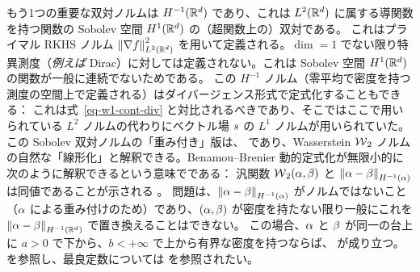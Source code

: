 \begin{example}[$H^{-1}(\RR^\dim)$]\label{exp-sobolev-neg1}
もう1つの重要な双対ノルムは $H^{-1}(\RR^\dim)$ であり、これは $L^2(\mathbb{R}^d)$ に属する導関数を持つ関数の Sobolev 空間 $H^1(\mathbb{R}^d)$ の（超関数上の）双対である。
%
これはプライマル RKHS ノルム $\left\| \nabla f \right\|_{L^2(\mathbb{R}^d)}^2$ を用いて定義される。$\dim=1$ でない限り特異測度（\emph{例えば} Dirac）に対しては定義されない。これは Sobolev 空間 $H^1(\mathbb{R}^d)$ の関数が一般に連続でないためである。
%
この $H^{-1}$ ノルム（零平均で密度を持つ測度の空間上で定義される）はダイバージェンス形式で定式化することもできる：
これは式~\eqref{eq-w1-cont-div} と対比されるべきであり、そこではここで用いられている $L^2$ ノルムの代わりにベクトル場 $s$ の $L^1$ ノルムが用いられていた。
%
この Sobolev 双対ノルムの「重み付き」版は、
であり、Wasserstein $\operatorname{\mathcal{W}}_2$ ノルムの自然な「線形化」と解釈できる。Benamou--Brenier 動的定式化が無限小的に次のように解釈できるという意味でである：
汎関数 $\operatorname{\mathcal{W}}_2(\alpha,\beta)$ と $\left\| \alpha-\beta \right\|_{H^{-1}(\alpha)}$ は同値であることが示される \citep{peyre2011comparison}。
%
問題は、$\left\| \alpha-\beta \right\|_{H^{-1}(\alpha)}$ がノルムではないこと（$\alpha$ による重み付けのため）であり、$(\alpha,\beta)$ が密度を持たない限り一般にこれを $\left\| \alpha-\beta \right\|_{H^{-1}(\mathbb{R}^d)}$ で置き換えることはできない。
%
この場合、$\alpha$ と $\beta$ が同一の台上に $a>0$ で下から、$b<+\infty$ で上から有界な密度を持つならば、
が成り立つ。\citep[Theo. 5.34]{SantambrogioBook} を参照し、最良定数については \citep{peyre2011comparison} を参照されたい。
\end{example}

